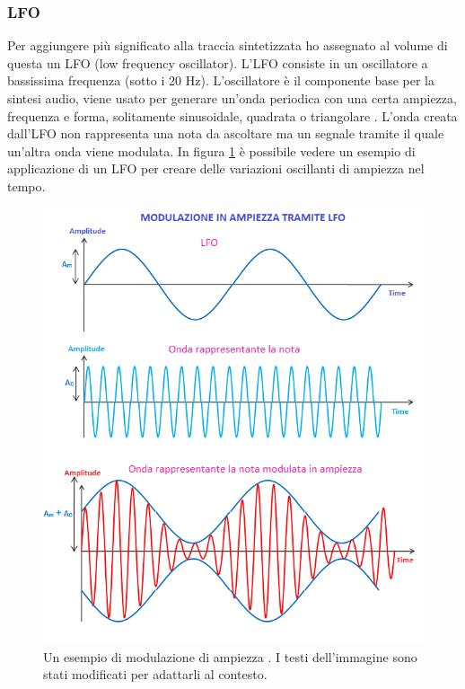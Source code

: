 \subsubsection{LFO}
Per aggiungere più significato alla traccia sintetizzata ho assegnato al volume di questa un LFO (low frequency oscillator).
L'LFO consiste in un oscillatore a bassissima frequenza (sotto i 20 Hz). L'oscillatore è il componente base per la sintesi audio, viene usato per generare un'onda periodica con una certa ampiezza, frequenza e forma, solitamente sinusoidale, quadrata o triangolare \cite{izotope}.
L'onda creata dall'LFO non rappresenta una nota da ascoltare ma un segnale tramite il quale un'altra onda viene modulata.
In figura \ref{fig:lfo} è possibile vedere un esempio di applicazione di un LFO per creare delle variazioni oscillanti di ampiezza nel tempo.
\begin{figure}[H]
    \includegraphics[width=\linewidth]{img/lfo.png}
    \caption{Un esempio di modulazione di ampiezza \cite{lfo_img}. I testi dell'immagine sono stati modificati per adattarli al contesto.}
    \label{fig:lfo}
\end{figure}
